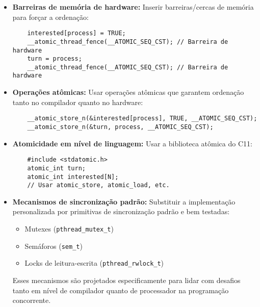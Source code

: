 \documentclass[12pt]{article}
\begin{document}
\begin{itemize}
    \item \textbf{Barreiras de memória de hardware:} Inserir barreiras/cercas de memória para forçar a ordenação:

    \begin{lstlisting}
    interested[process] = TRUE;
    __atomic_thread_fence(__ATOMIC_SEQ_CST); // Barreira de hardware
    turn = process;
    __atomic_thread_fence(__ATOMIC_SEQ_CST); // Barreira de hardware
    \end{lstlisting}

    \item \textbf{Operações atômicas:} Usar operações atômicas que garantem ordenação tanto no compilador quanto no hardware:

    \begin{lstlisting}
    __atomic_store_n(&interested[process], TRUE, __ATOMIC_SEQ_CST);
    __atomic_store_n(&turn, process, __ATOMIC_SEQ_CST);
    \end{lstlisting}

    \item \textbf{Atomicidade em nível de linguagem:} Usar a biblioteca atômica do C11:

    \begin{lstlisting}
    #include <stdatomic.h>
    atomic_int turn;
    atomic_int interested[N];
    // Usar atomic_store, atomic_load, etc.
    \end{lstlisting}

    \item \textbf{Mecanismos de sincronização padrão:} Substituir a implementação personalizada por primitivas de sincronização padrão e bem testadas:
    \begin{itemize}
        \item Mutexes (\texttt{pthread\_mutex\_t})
        \item Semáforos (\texttt{sem\_t})
        \item Locks de leitura-escrita (\texttt{pthread\_rwlock\_t})
    \end{itemize}

    Esses mecanismos são projetados especificamente para lidar com desafios tanto em nível de compilador quanto de processador na programação concorrente.
\end{itemize}
\end{document}
